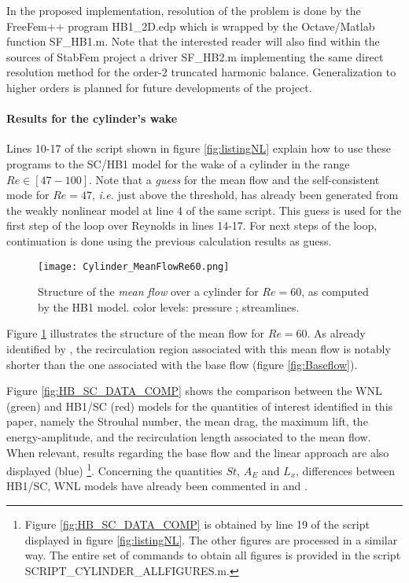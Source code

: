 \documentclass[twocolumn,10pt]{asme2ej}
\begin{document}
In the proposed implementation, resolution of the problem is done by the FreeFem++ program {\sf  HB1\_2D.edp} which is wrapped by the Octave/Matlab function {\sf  SF\_HB1.m}.
Note that the interested reader will also find within the sources of StabFem project a driver {\sf  SF\_HB2.m} implementing the same direct resolution method for the order-2 truncated harmonic balance.
Generalization to higher orders is planned for future developments of the project.
  
 \paragraph{Results for the cylinder's wake}
 
Lines 10-17 of the script shown in figure \ref{fig:listingNL} explain how to use these programs to the SC/HB1 model for the wake of a cylinder in the range $Re \in [47-100] $. Note that a {\em guess} for the mean flow and the self-consistent mode for $Re = 47$, \textit{i.e.} just above the threshold, has already been generated from the weakly nonlinear model at line 4 of the same script. This guess is used for the first step of the loop over Reynolds in lines 14-17. For next steps of the loop, continuation is done using the previous calculation results as guess.

\begin{figure}
\begin{center}
\texttt{[image: Cylinder\_MeanFlowRe60.png]}
\end{center}
\caption{Structure of the {\em mean flow} over a cylinder for $Re = 60$, as computed by the HB1 model. color levels: pressure ; streamlines.}
\label{fig:MF60}
\end{figure}



Figure \ref{fig:MF60} illustrates the structure of the mean flow for $Re=60$.
As already identified by  \cite{MLugo2014}, the recirculation region associated with this mean flow is notably shorter than the one associated with the base flow (figure \ref{fig:Baseflow}). 



Figure \ref{fig:HB_SC_DATA_COMP} shows the comparison between the WNL (green) and HB1/SC (red) models for the quantities of interest identified in this paper, namely the Strouhal number, the mean drag, the maximum lift, the energy-amplitude, and the recirculation length associated to the mean flow. When relevant, results regarding the base flow and the linear approach are also displayed (blue)
\footnote{Figure   \ref{fig:HB_SC_DATA_COMP} is obtained by line 19 of the script displayed in figure \ref{fig:listingNL}. The other figures are processed in a similar way. The entire set of commands to obtain all figures is provided in the script {\sf SCRIPT\_CYLINDER\_ALLFIGURES.m}.}.
Concerning the quantities $St$, $A_E$ and $L_x$, differences between HB1/SC, WNL models have already been commented in \cite{MLugo2014} and \cite{FDR2016}. 
\end{document}
